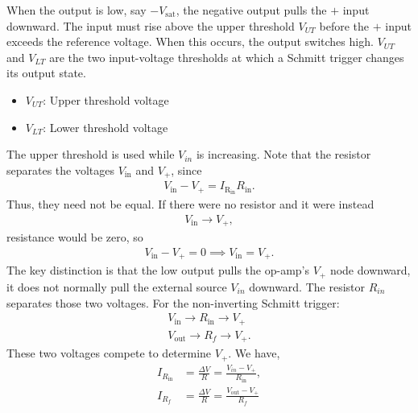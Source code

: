 \documentclass{report}
\begin{document}
\begin{itemize}
            \bigbreak \noindent 
            When the output is low, say $-V_{\text{sat}}$, the negative output pulls the $+$ input downward. The input must rise above the upper threshold \(V_{UT}\) before the \(+\) input exceeds the reference voltage. When this occurs, the output switches high.
            \bigbreak \noindent 
            $V_{UT}$ and \(V_{LT}\) are the two input-voltage thresholds at which a Schmitt trigger changes its output state.
            \begin{itemize}
                \item \(V_{UT}\): Upper threshold voltage
                \item \(V_{LT}\): Lower threshold voltage
            \end{itemize}
            The upper threshold is used while \(V_{in}\) is increasing. Note that the resistor separates the voltages $V_{\text{in}}$ and $V_{+}$, since
            \begin{align*}
                V_{\text{in}} - V_{+} = I_{\text{R}_{\text{in}}}R_{\text{in}}
            .\end{align*}
            Thus, they need not be equal. If there were no resistor and it were instead
            \begin{align*}
                V_{\text{in}} \to V_{+}
            ,\end{align*}
            resistance would be zero, so
            \begin{align*}
                V_{\text{in}} - V_{+} = 0 \implies V_{\text{in}} = V_{+}
            .\end{align*}
            The key distinction is that the low output pulls the op-amp’s \(V_+\) node downward, it does not normally pull the external source \(V_{in}\) downward. The resistor \(R_{in}\) separates those two voltages.
            \bigbreak \noindent 
            For the non-inverting Schmitt trigger:
            \begin{align*}
                V_{\text{in}} \to R_{\text{in}} \to V_{+} \\
                V_{\text{out}} \to R_{f} \to V_{+}
            .\end{align*}
            These two voltages compete to determine $V_{+}$. 
            \bigbreak \noindent 
            We have,
            \begin{align*}
                I_{R_{\text{in}}} &= \frac{\Delta V}{R} = \frac{V_{in} - V_{+}}{R_{\text{in}}}, \\
                I_{R_{f}} &= \frac{\Delta V}{R} = \frac{V_{\text{out}} - V_{+}}{R_{f}}

\end{align*}
\end{itemize}
\end{document}
